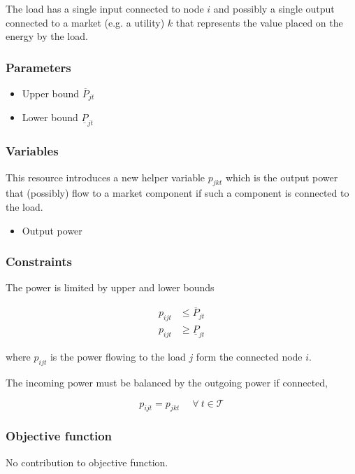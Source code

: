 \documentclass[]{report}
\newcommand{\timesteps}{\mathcal{T}}
\newcommand{\ub}[1]{\overline{#1}}
\newcommand{\lb}[1]{\underline{#1}}
\let\oldforall\forall
\renewcommand{\forall}{\; \oldforall \: }
\begin{document}
The load has a single input connected to node $i$ and possibly a single output connected to a market (e.g. a utility) $k$ that represents the value placed on the energy by the load.

\subsubsection*{Parameters}
\begin{itemize}
    \item Upper bound $\ub{P}_{jt}$
    \item Lower bound $\lb{P}_{jt}$
\end{itemize}

\subsubsection*{Variables}
This resource introduces a new helper variable $p_{jkt}$ which is the output power that (possibly) flow to a market component if such a component is connected to the load.

\begin{itemize}
    \item [$p_{jkt}$] Output power
\end{itemize}

\subsubsection*{Constraints}
The power is limited by upper and lower bounds

\begin{align}
    p_{ijt} &\leq \ub{P}_{jt} \\
    p_{ijt} &\geq \lb{P}_{jt} 
\end{align}

where $p_{ijt}$ is the power flowing to the load $j$ form the connected node $i$.

The incoming power must be balanced by the outgoing power if connected,

\begin{equation}
    p_{ijt} = p_{jkt} \quad \forall t \in \timesteps
\end{equation}

\subsubsection*{Objective function}

No contribution to objective function.
\end{document}
